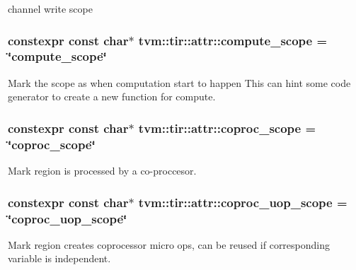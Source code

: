 channel write scope 

\subsubsection[{\texorpdfstring{compute\+\_\+scope}{compute_scope}}]{\setlength{\rightskip}{0pt plus 5cm}constexpr const char$\ast$ tvm\+::tir\+::attr\+::compute\+\_\+scope = \char`\"{}compute\+\_\+scope\char`\"{}}\hypertarget{namespacetvm_1_1tir_1_1attr_a00a6b89838348f152d844cead81b5016}{}\label{namespacetvm_1_1tir_1_1attr_a00a6b89838348f152d844cead81b5016}


Mark the scope as when computation start to happen This can hint some code generator to create a new function for compute. 

\subsubsection[{\texorpdfstring{coproc\+\_\+scope}{coproc_scope}}]{\setlength{\rightskip}{0pt plus 5cm}constexpr const char$\ast$ tvm\+::tir\+::attr\+::coproc\+\_\+scope = \char`\"{}coproc\+\_\+scope\char`\"{}}\hypertarget{namespacetvm_1_1tir_1_1attr_ac62a341bfebe5448f290aa54b0f84cac}{}\label{namespacetvm_1_1tir_1_1attr_ac62a341bfebe5448f290aa54b0f84cac}


Mark region is processed by a co-\/proccesor. 

\subsubsection[{\texorpdfstring{coproc\+\_\+uop\+\_\+scope}{coproc_uop_scope}}]{\setlength{\rightskip}{0pt plus 5cm}constexpr const char$\ast$ tvm\+::tir\+::attr\+::coproc\+\_\+uop\+\_\+scope = \char`\"{}coproc\+\_\+uop\+\_\+scope\char`\"{}}\hypertarget{namespacetvm_1_1tir_1_1attr_ae1d3379e8d6486e79853e254ea9a724e}{}\label{namespacetvm_1_1tir_1_1attr_ae1d3379e8d6486e79853e254ea9a724e}


Mark region creates coprocessor micro ops, can be reused if corresponding variable is independent. 

